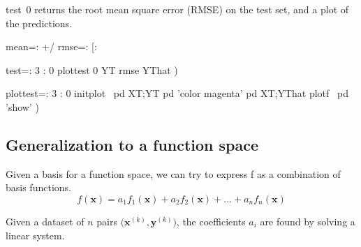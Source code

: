 \documentclass[10pt]{article}%
\renewcommand{\vec}[1]{\boldsymbol{#1}}
\begin{document}
{\Tt{}test\ 0\nwendquote} returns the root mean square error (RMSE) on the test set, and a plot
of the predictions.

\nwenddocs{}\plusendmoddef\nwstartdeflinemarkup{}\nwenddeflinemarkup
mean=: +/ %
rmse=: [: %

\nwendcode{}\endmoddef\nwstartdeflinemarkup{}\nwenddeflinemarkup
test=: 3 : 0
  plottest 0
  YT rmse YThat
)

\nwendcode{}\endmoddef\nwstartdeflinemarkup{}\nwenddeflinemarkup
plottest=: 3 : 0
  \LA{}initplot~{\nwtagstyle{}}\RA{}
  pd XT;YT
  pd 'color magenta'
  pd XT;YThat
  \LA{}plotf~{\nwtagstyle{}}\RA{}
  pd 'show'
)

\nwendcode{}\nwdocspar
\subsection{Generalization to a function space}
Given a basis for a function space, we can try to express {\Tt{}f\nwendquote} as a combination
of basis functions.
\[
f(\vec{x}) = a_1 f_1(\vec{x}) + a_2 f_2(\vec{x}) + \dots + a_n f_n(\vec{x})
\]

Given a dataset of $n$ pairs $\biggl(\vec{x}^{(k)},\vec{y}^{(k)}\biggr)$, the
coefficients $a_i$ are found by solving a linear system.
\end{document}
